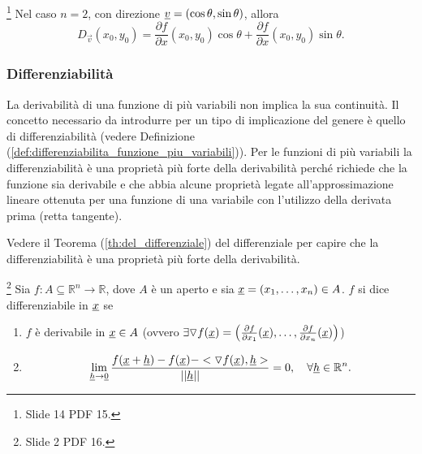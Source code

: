 \begin{example}\footnote{Slide 14 PDF 15.}
	Nel caso $n=2$, con direzione $\uline v=(\cos\theta,\sin\theta)$, allora
	\begin{equation*}
		D_{\vec{v}}(x_0,y_0) = \frac{\partial f}{\partial x}(x_0,y_0) \cos\theta + \frac{\partial f}{\partial x}(x_0,y_0) \sin\theta.
	\end{equation*}
\end{example}

\subsubsection{Differenziabilità}
La derivabilità di una funzione di più variabili non implica la sua continuità. Il concetto necessario da introdurre per un tipo di implicazione del genere è quello di differenziabilità (vedere Definizione (\ref{def:differenziabilita_funzione_piu_variabili})). Per le funzioni di più variabili la differenziabilità è una proprietà più forte della derivabilità perché richiede che la funzione sia derivabile e che abbia alcune proprietà legate all'approssimazione lineare ottenuta per una funzione di una variabile con l'utilizzo della derivata prima (retta tangente).

Vedere il Teorema (\ref{th:del_differenziale}) del differenziale per capire che la differenziabilità è una proprietà più forte della derivabilità.

\begin{definition}[Differenziabilità]\label{def:differenziabilita_funzione_piu_variabili}\footnote{Slide 2 PDF 16.}
	Sia $f:A\subseteq\mathbb{R}^n\rightarrow\mathbb{R}$, dove $A$ è un aperto e sia $\uline{x} = (x_1,\hdots, x_n)\in A$. $f$ si dice differenziabile in $\uline x$ se
	\begin{enumerate}
		\item $f$ è derivabile in $\uline x\in A$ (ovvero $\exists \triangledown f(\uline x)=\left(\frac{\partial f}{\partial x_1}(\uline x), \hdots, \frac{\partial f}{\partial x_n}(\uline x) \right)$)
		\item
		\begin{equation}\label{eq:limite_differenziabilita}
			\lim\limits_{\uline h\rightarrow \uline 0}\frac{f(\uline x + \uline h) - f(\uline x) - <\triangledown f(\uline x), \uline h>}{||\uline h||} = 0,\quad \forall \uline h\in\mathbb{R}^n.
		\end{equation}
	\end{enumerate}
\end{definition}

